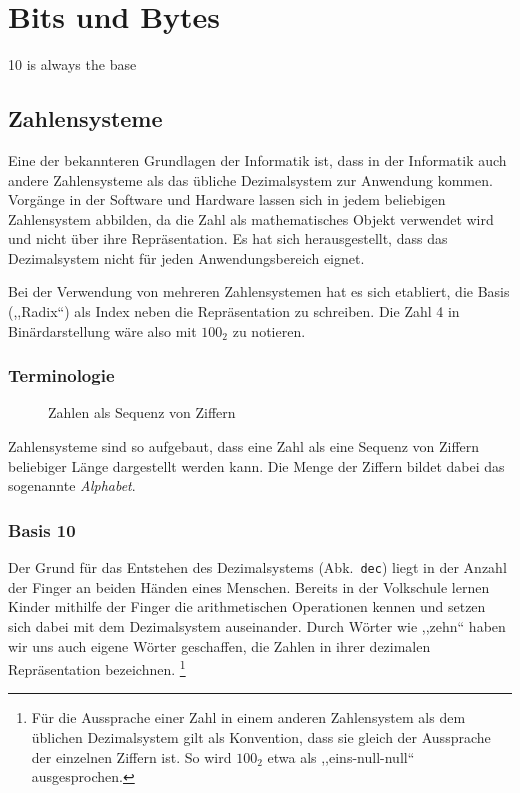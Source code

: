 \chapter{Bits und Bytes}
\epigraph{10 is always the base}{}
\newcommand{\short}[1]{Abk.~\texttt{#1}}
%
\section{Zahlensysteme}
%
Eine der bekannteren Grundlagen der Informatik ist, dass in der Informatik
auch andere Zahlensysteme als das übliche Dezimalsystem zur Anwendung kommen.
Vorgänge in der Software und Hardware lassen sich in jedem beliebigen
Zahlensystem abbilden, da die Zahl als mathematisches Objekt verwendet wird
und nicht über ihre Repräsentation. Es hat sich herausgestellt, dass das
Dezimalsystem nicht für jeden Anwendungsbereich eignet.

Bei der Verwendung von mehreren Zahlensystemen hat es sich etabliert,
die Basis (,,Radix``) als Index neben die Repräsentation zu schreiben.
Die Zahl 4 in Binärdarstellung wäre also mit $100_2$ zu notieren.
%
\subsection{Terminologie}
%
\begin{figure}[ht]
  \begin{center}
  \end{center}
  \caption{Zahlen als Sequenz von Ziffern}
  \label{fig:seq_digits}
\end{figure}

Zahlensysteme sind so aufgebaut, dass eine Zahl als eine Sequenz von Ziffern
beliebiger Länge dargestellt werden kann. Die Menge der Ziffern bildet dabei
das sogenannte \emph{Alphabet}.

\subsection{Basis 10}
\label{sec:bits_numeric_systems_10}
%
Der Grund für das Entstehen des Dezimalsystems (\short{dec}) liegt in der
Anzahl der Finger an beiden Händen eines Menschen. Bereits in der Volkschule
lernen Kinder mithilfe der Finger die arithmetischen Operationen kennen und
setzen sich dabei mit dem Dezimalsystem auseinander. Durch Wörter wie ,,zehn``
haben wir uns auch eigene Wörter geschaffen, die Zahlen in ihrer dezimalen
Repräsentation bezeichnen.%
\footnote{Für die Aussprache einer Zahl in einem anderen Zahlensystem als dem
üblichen Dezimalsystem gilt als Konvention, dass sie gleich der Aussprache der
einzelnen Ziffern ist. So wird $100_2$ etwa als ,,eins-null-null`` ausgesprochen.}

